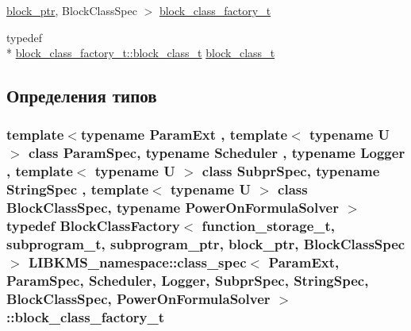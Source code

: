 \begin{DoxyCompactItemize}
\hyperlink{structLIBKMS__namespace_1_1class__spec_acbfd7c07aa4238536acc8d1ee3bca661}{block\-\_\-ptr}, Block\-Class\-Spec $>$ \hyperlink{structLIBKMS__namespace_1_1class__spec_ac0aef59f5e6f6682911653c2e44faaf3}{block\-\_\-class\-\_\-factory\-\_\-t}
\item 
typedef \\*
\hyperlink{classLIBKMS__namespace_1_1BlockClassFactory_ab6e704b98791fd6c718cfbb0fe2d2a5a}{block\-\_\-class\-\_\-factory\-\_\-t\-::block\-\_\-class\-\_\-t} \hyperlink{structLIBKMS__namespace_1_1class__spec_a286bbf51f31bec7830f08859385897d0}{block\-\_\-class\-\_\-t}
\end{DoxyCompactItemize}


\subsection{Определения типов}
\hypertarget{structLIBKMS__namespace_1_1class__spec_ac0aef59f5e6f6682911653c2e44faaf3}{
\subsubsection[{block\-\_\-class\-\_\-factory\-\_\-t}]{\setlength{\rightskip}{0pt plus 5cm}template$<$typename Param\-Ext , template$<$ typename U $>$ class Param\-Spec, typename Scheduler , typename Logger , template$<$ typename U $>$ class Subpr\-Spec, typename String\-Spec , template$<$ typename U $>$ class Block\-Class\-Spec, typename Power\-On\-Formula\-Solver $>$ typedef {\bf Block\-Class\-Factory}$<$ {\bf function\-\_\-storage\-\_\-t}, {\bf subprogram\-\_\-t}, {\bf subprogram\-\_\-ptr}, {\bf block\-\_\-ptr}, Block\-Class\-Spec $>$ {\bf L\-I\-B\-K\-M\-S\-\_\-namespace\-::class\-\_\-spec}$<$ Param\-Ext, Param\-Spec, Scheduler, Logger, Subpr\-Spec, String\-Spec, Block\-Class\-Spec, Power\-On\-Formula\-Solver $>$\-::{\bf block\-\_\-class\-\_\-factory\-\_\-t}}}\label{structLIBKMS__namespace_1_1class__spec_ac0aef59f5e6f6682911653c2e44faaf3}
